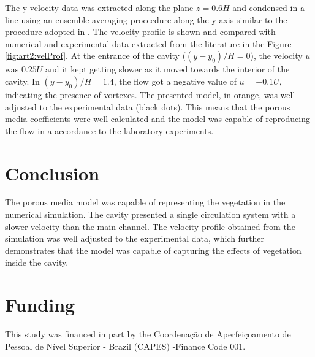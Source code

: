 The y-velocity data was extracted along the plane $z=0.6H$ and condensed in a line using an ensemble averaging proceedure along the y-axis similar to the procedure adopted in \textcite{sukhodolov2014}. The velocity profile is shown and compared with numerical and experimental data extracted from the literature in the Figure \ref{fig:art2:velProf}. At the entrance of the cavity ($(y-y_0)/H = 0$), the velocity $u$ was $0.25U$ and it kept getting slower as it moved towards the interior of the cavity. In $(y-y_0)/H = 1.4$, the flow got a negative value of $u = -0.1U$, indicating the presence of vortexes. The presented model, in orange, was well adjusted to the experimental data (black dots). This means that the porous media coefficients were well calculated and the model was capable of reproducing the flow in a accordance to the laboratory experiments.

\section{Conclusion}
The porous media model was capable of representing the vegetation in the numerical simulation. The cavity presented a single circulation system with a slower velocity than the main channel. The velocity profile obtained from the simulation was well adjusted to the experimental data, which further demonstrates that the model was capable of capturing the effects of vegetation inside the cavity.

\section*{Funding}
This study was financed in part by the Coordenação de Aperfeiçoamento de Pessoal de Nível Superior - Brazil (CAPES) -Finance Code 001.
\printbibliography[segment=\therefsegment,heading=subbibliography, title={References}]